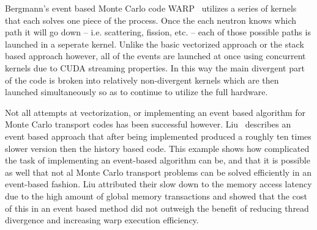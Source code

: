 Bergmann's event based Monte Carlo code WARP~\cite{2014development} utilizes a series of kernels that each solves one piece of the process.
%
Once the each neutron knows which path it will go down -- i.e. scattering, fission, etc. -- each of those possible paths is launched in a seperate kernel.
%
Unlike the basic vectorized approach or the stack based approach however, all of the events are launched at once using concurrent kernels due to CUDA streaming properties.
%
In this way the main divergent part of the code is broken into relatively non-divergent kernels which are then launched simultaneously so as to continue to utilize the full hardware.

Not all attempts at vectorization, or implementing an event based algorithm for Monte Carlo transport codes has been successful however.
%
Liu~\cite{liu2014comparative} describes an event based approach that after being implemented produced a roughly ten times slower version then the history based code.
%
This example shows how complicated the task of implementing an event-based algorithm can be, and that it is possible as well that not al Monte Carlo transport problems can be solved efficiently in an event-based fashion.
%
Liu attributed their slow down to the memory access latency due to the high amount of global memory transactions and showed that the cost of this in an event based method did not outweigh the benefit of reducing thread divergence and increasing warp execution efficiency.





